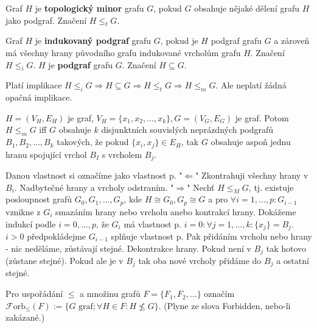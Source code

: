 \begin{definice}
	Graf $H$ je \textbf{topologický minor} grafu $G$, pokud $G$ obsahuje nějaké dělení grafu $H$ jako podgraf. Značení $H \leq_{t} G$.
\end{definice}

\begin{definice}
	Graf $H$ je \textbf{indukovaný podgraf} grafu $G$, pokud je $H$ podgraf grafu $G$ a zároveň má všechny hrany původního grafu indukované vrcholům grafu $H$. Značení $H \leq_{i} G$. $H$ je \textbf{podgraf} grafu $G$. Značení $H \subseteq G$.
\end{definice}

\begin{pozor}
	Platí implikace $H \leq_{i} G \Rightarrow H \subseteq G \Rightarrow H \leq_{t} G \Rightarrow H \leq_{m} G$. Ale neplatí žádná opačná implikace.
\end{pozor}

\begin{lemma}
	$H = (V_{H}, E_{H})$ je graf, $V_{H} = \{x_{1}, x_{2}, \dots, x_{k}\}, G=(V_{G},E_{G})$ je graf. Potom $H \leq_{m} G$ iff $G$ obsahuje $k$ disjunktních souvislých neprázdných podgrafů $B_{1}, B_{2}, \dots , B_{k}$ takových, že pokud $\{x_{i}, x_{j}\} \in E_{H}$, tak $G$ obsahuje aspoň jednu hranu spojující vrchol $B_{I}$ s vrcholem $B_{j}$.
\end{lemma}

\begin{dukaz}
	Danou vlastnost si označíme jako vlastnost p. "$\Leftarrow$" Zkontrahuji všechny hrany v $B_{i}$. Nadbytečné hrany a vrcholy odstraním. "$\Rightarrow$" Nechť $H \leq_{M} G$, tj. existuje posloupnost grafů $G_{0}, G_{1}, \dots ,G_{p}$, kde $H \cong G_{0}, G_{p} \cong G$ a pro $\forall i = 1, \dots, p: G_{i-1}$ vznikne z $G_{i}$ smazáním hrany nebo vrcholu anebo kontrakcí hrany. Dokážeme indukcí podle $i = 0, \dots, p$, že $G_{i}$ má vlastnost p. $i = 0: \forall j = 1, \dots ,k: \{x_{j}\} = B_{j}$. $i > 0$ předpokládejme $G_{i-1}$ splňuje vlastnost p. Pak přidáním vrcholu nebo hrany - nic neděláme, zůstávají stejné. Dekontrakce hrany. Pokud není v $B_{j}$ tak hotovo (zůstane stejné). Pokud ale je v $B_{j}$ tak oba nové vrcholy přidáme do $B_{j}$ a ostatní stejné.
\end{dukaz}

\begin{definice}
	Pro uspořádání $\leq$ a množinu grafů $F = \{F_{1}, F_{2}, \dots\}$ označím $\mathcal{F}\text{orb}_{\leq}(F) := \{G \text{ graf}; \forall H \in F: H \nleq G\}$. (Plyne ze slova Forbidden, nebo-li zakázané.)
\end{definice}

